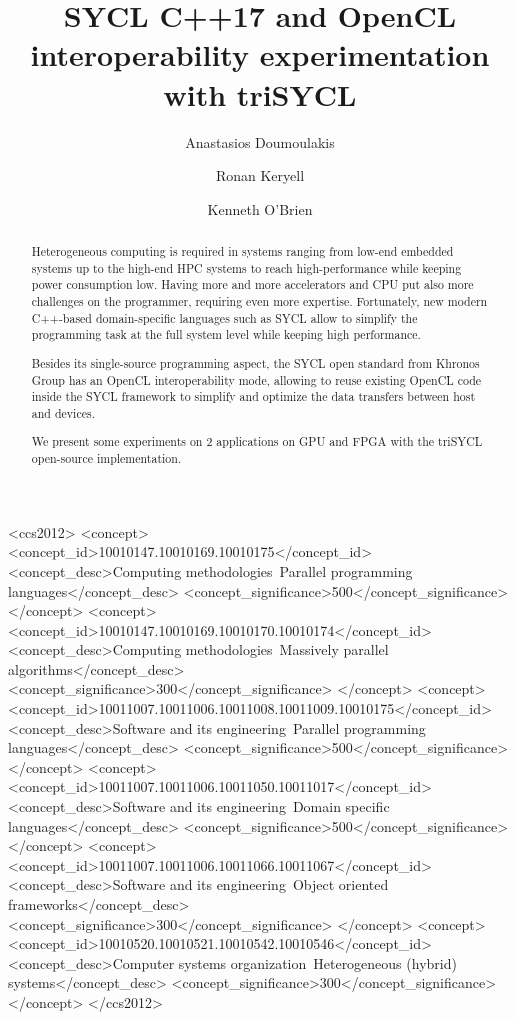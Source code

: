 \documentclass[sigplan, review]{acmart}
\begin{document}
\title{SYCL C++17 and OpenCL interoperability experimentation with
  triSYCL}

\author{Anastasios Doumoulakis}

\author{Ronan Keryell}

\author{Kenneth O'Brien}



\begin{abstract}
  Heterogeneous computing is required in systems ranging from low-end
  embedded systems up to the high-end HPC systems to reach
  high-performance while keeping power consumption low. Having more
  and more accelerators and CPU put also more challenges on the
  programmer, requiring even more expertise. Fortunately, new modern
  C++-based domain-specific languages such as SYCL allow to simplify
  the programming task at the full system level while keeping high
  performance.

  Besides its single-source programming aspect, the SYCL open standard
  from Khronos Group has an OpenCL interoperability mode, allowing to
  reuse existing OpenCL code inside the SYCL framework to simplify and
  optimize the data transfers between host and devices.

  We present some experiments on 2 applications on GPU and FPGA with
  the triSYCL open-source implementation.
\end{abstract}

%
\begin{CCSXML}
<ccs2012>
<concept>
<concept_id>10010147.10010169.10010175</concept_id>
<concept_desc>Computing methodologies~Parallel programming languages</concept_desc>
<concept_significance>500</concept_significance>
</concept>
<concept>
<concept_id>10010147.10010169.10010170.10010174</concept_id>
<concept_desc>Computing methodologies~Massively parallel algorithms</concept_desc>
<concept_significance>300</concept_significance>
</concept>
<concept>
<concept_id>10011007.10011006.10011008.10011009.10010175</concept_id>
<concept_desc>Software and its engineering~Parallel programming languages</concept_desc>
<concept_significance>500</concept_significance>
</concept>
<concept>
<concept_id>10011007.10011006.10011050.10011017</concept_id>
<concept_desc>Software and its engineering~Domain specific languages</concept_desc>
<concept_significance>500</concept_significance>
</concept>
<concept>
<concept_id>10011007.10011006.10011066.10011067</concept_id>
<concept_desc>Software and its engineering~Object oriented frameworks</concept_desc>
<concept_significance>300</concept_significance>
</concept>
<concept>
<concept_id>10010520.10010521.10010542.10010546</concept_id>
<concept_desc>Computer systems organization~Heterogeneous (hybrid) systems</concept_desc>
<concept_significance>300</concept_significance>
</concept>
</ccs2012>
\end{CCSXML}
\end{document}
